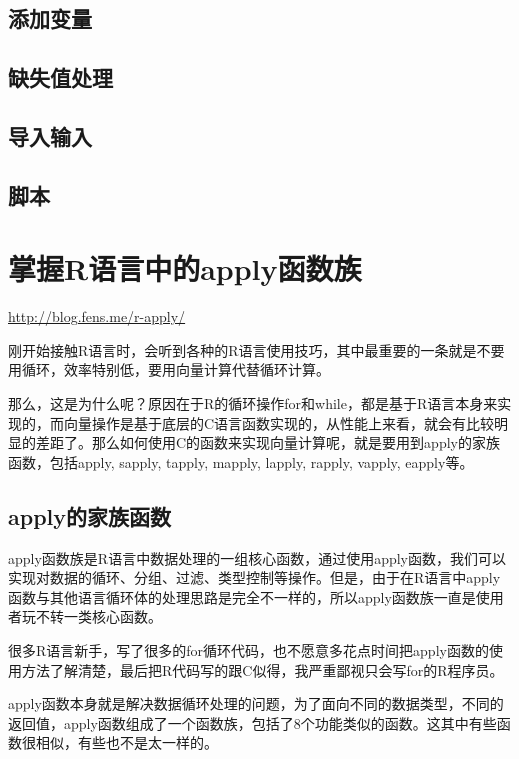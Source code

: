\documentclass[]{book}
\begin{document}
\section{添加变量}

\section{缺失值处理}

\section{导入输入}

\section{脚本}

\hypertarget{rapply}{%
\chapter{掌握R语言中的apply函数族}\label{rapply}}

\url{http://blog.fens.me/r-apply/}

刚开始接触R语言时，会听到各种的R语言使用技巧，其中最重要的一条就是不要用循环，效率特别低，要用向量计算代替循环计算。

那么，这是为什么呢？原因在于R的循环操作for和while，都是基于R语言本身来实现的，而向量操作是基于底层的C语言函数实现的，从性能上来看，就会有比较明显的差距了。那么如何使用C的函数来实现向量计算呢，就是要用到apply的家族函数，包括apply,
sapply, tapply, mapply, lapply, rapply, vapply, eapply等。

\hypertarget{apply}{%
\section{apply的家族函数}\label{apply}}

apply函数族是R语言中数据处理的一组核心函数，通过使用apply函数，我们可以实现对数据的循环、分组、过滤、类型控制等操作。但是，由于在R语言中apply函数与其他语言循环体的处理思路是完全不一样的，所以apply函数族一直是使用者玩不转一类核心函数。

很多R语言新手，写了很多的for循环代码，也不愿意多花点时间把apply函数的使用方法了解清楚，最后把R代码写的跟C似得，我严重鄙视只会写for的R程序员。

apply函数本身就是解决数据循环处理的问题，为了面向不同的数据类型，不同的返回值，apply函数组成了一个函数族，包括了8个功能类似的函数。这其中有些函数很相似，有些也不是太一样的。
\end{document}
